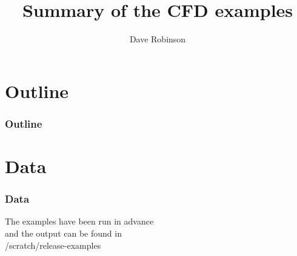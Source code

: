 \documentclass[10pt]{beamer}
\title[CFD examples]{Summary of the CFD examples}
\subtitle[]{}
\institute{Department of Earth Science and Engineering, Imperial College London}
\author[Robinson]{\large{Dave Robinson}}
\date{}
\begin{document}
\begin{frame}
  \titlepage
\end{frame}

\section*{Outline}
\begin{frame}
  \frametitle{Outline}
  \tableofcontents
\end{frame}







\section*{Data}
\begin{frame}
  \frametitle{Data}
  \begin{center}
  The examples have been run in advance \\ and the output can be found in \\ /scratch/release-examples
  \end{center}
\end{frame}
\end{document}
